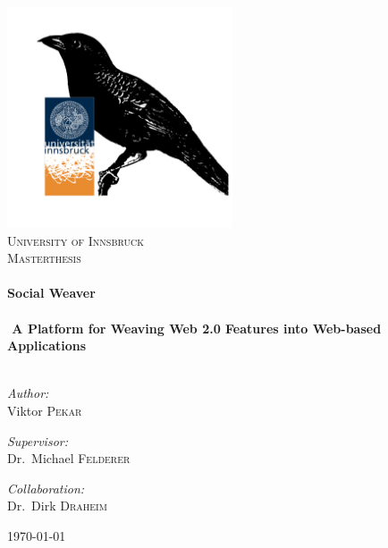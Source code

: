 \documentclass[]{article}
\begin{document}
\begin{titlepage}
\begin{center}


\includegraphics[width=0.5\textwidth]{images/sowebird+uibk.png}~\\[1cm]

\textsc{\LARGE University of Innsbruck}\\[1.5cm]

\textsc{\Large Masterthesis}\\[0.5cm]

\HRule \\[0.4cm]
{ \huge \bfseries Social Weaver\\
\HRule \\[0.2cm] \large A Platform for Weaving Web 2.0 Features into Web-based Applications}\\[0.4cm]

\HRule \\[1.5cm]

\begin{minipage}{0.4\textwidth}
\begin{flushleft} \large
\emph{Author:}\\
Viktor \textsc{Pekar}
\end{flushleft}
\end{minipage}
\begin{minipage}{0.4\textwidth}
\begin{flushright} \large
\emph{Supervisor:} \\
Dr.~Michael \textsc{Felderer}
\end{flushright}
\begin{flushright} \large
\emph{Collaboration:} \\
Dr.~Dirk \textsc{Draheim}
\end{flushright}

\end{minipage}

\vfill

{\large \today}

\end{center}
\end{titlepage}
\newpage
\end{document}
